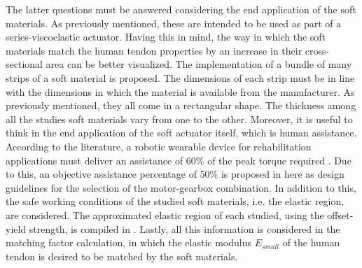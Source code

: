 The latter questions must be answered considering the end application of the soft materials. As previously mentioned, these are intended to be used as part of a series-viscoelastic actuator. Having this in mind, the way in which the soft materials match the human tendon properties by an increase in their cross-sectional area can be better visualized. The implementation of a bundle of many strips of a soft material is proposed. The dimensions of each strip must be in line with the dimensions in which the material is available from the manufacturer. As previously mentioned, they all come in a rectangular shape. The thickness among all the studies soft materials vary from one to the other. Moreover, it is useful to think in the end application of the soft actuator itself, which is human assistance. According to the literature, a robotic wearable device for rehabilitation applications must deliver an assistance of 60\% of the peak torque required \cite{dos2014impedance}. Due to this, an objective assistance percentage of 50\% is proposed in here as design guidelines for the selection of the motor-gearbox combination. In addition to this, the safe working conditions of the studied soft materials, i.e. the elastic region, are considered. The approximated elastic region of each studied, using the offset-yield strength, is compiled in . Lastly, all this information is considered in the matching factor calculation, in which the elastic modulus $E_{small}$ of the human tendon is desired to be matched by the soft materials.

